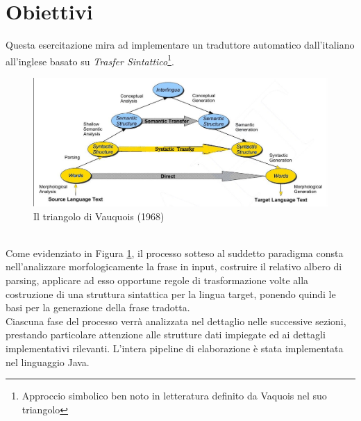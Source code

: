 \section{Obiettivi}
Questa esercitazione mira ad implementare un traduttore automatico
dall'italiano all'inglese basato su \textit{Trasfer Sintattico}\footnote{Approccio simbolico ben noto in letteratura definito da Vaquois nel suo triangolo\cite{book}}.
\begin{figure}[ht]
	\centering 
	\includegraphics[scale=0.25]{./img/TransferSintattico}
	\caption{Il triangolo di Vauquois (1968)}
	\label{Vauquois_triangle}
\end{figure}\\
Come evidenziato in Figura \ref{Vauquois_triangle}, il processo sotteso al suddetto paradigma consta 
nell'analizzare morfologicamente la frase in input, costruire il relativo albero di parsing, applicare ad esso opportune regole di trasformazione volte alla costruzione di una struttura sintattica per la lingua target, ponendo quindi le basi per la generazione della frase tradotta. \\
Ciascuna fase del processo verrà analizzata nel dettaglio nelle successive sezioni, prestando particolare attenzione alle strutture dati impiegate ed ai dettagli implementativi rilevanti. L'intera pipeline di elaborazione è stata implementata
nel linguaggio Java. 

